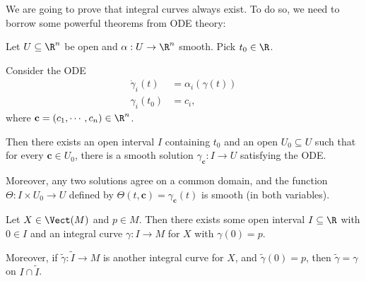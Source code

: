\documentclass[a4paper]{article}
\begin{document}
We are going to prove that integral curves always exist. To do so, we need to borrow some powerful theorems from ODE theory:
\begin{thm}
  Let $U \subseteq \R^n$ be open and $\alpha: U \to \R^n$ smooth. Pick $t_0 \in \R$.

  Consider the ODE
  \begin{align*}
    \dot{\gamma}_i(t) &= \alpha_i(\gamma(t))\\
    \gamma_i(t_0) &= c_i,
  \end{align*}
  where $\mathbf{c} = (c_1, \cdots, c_n) \in \R^n$.

  Then there exists an open interval $I$ containing $t_0$ and an open $U_0 \subseteq U$ such that for every $\mathbf{c} \in U_0$, there is a smooth solution $\gamma_\mathbf{c}:I \to U$ satisfying the ODE.

  Moreover, any two solutions agree on a common domain, and the function $\Theta: I \times U_0 \to U$ defined by $\Theta(t, \mathbf{c}) = \gamma_\mathbf{c}(t)$ is smooth (in both variables).
\end{thm}

\begin{thm}
  Let $X \in \Vect(M)$ and $p \in M$. Then there exists some open interval $I \subseteq \R$ with $0 \in I$ and an integral curve $\gamma: I \to M$ for $X$ with $\gamma(0) = p$.

  Moreover, if $\tilde{\gamma}: \tilde{I} \to M$ is another integral curve for $X$, and $\tilde{\gamma}(0) = p$, then $\tilde{\gamma} = \gamma$ on $I \cap \tilde{I}$.
\end{thm}
\end{document}
